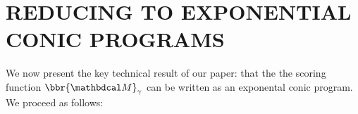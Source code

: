 \documentclass[twoside]{article}
\begin{document}
\section{REDUCING TO EXPONENTIAL CONIC PROGRAMS}

    \label{sec:reductions}
    We now present the key technical result of our paper: 
    that the
the scoring function $\bbr{\dg M}_\gamma$
can be written as an exponental conic program. 
%
We proceed as follows: 
\end{document}
